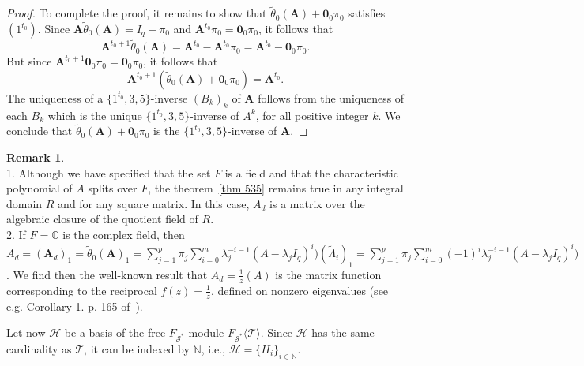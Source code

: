 \documentclass[12pt]{amsart}
\theoremstyle{definition}
\newtheorem{remark}[thrm]{Remark}
\numberwithin{equation}{section}
\numberwithin{equation}{section}
\begin{document}
\begin{proof}
To complete the proof, it remains to show that $\widetilde{\theta}_{0}(\pmb{A})+\pmb{0}_{0}\pi_{0}$ satisfies $(1^{t_{0}})$. Since $\pmb{A}\widetilde{\theta}_{0}(\pmb{A})=I_{q}-\pi_{0}$ and $\pmb{A}^{t_{0}}\pi_{0}=\pmb{0}_{0}\pi_{0}$, it follows that $$\pmb{A}^{t_{0}+1}\widetilde{\theta}_{0}(\pmb{A})=\pmb{A}^{t_{0}}-\pmb{A}^{t_{0}}\pi_{0}=\pmb{A}^{t_{0}}-\pmb{0}_{0}\pi_{0}.$$ But since $\pmb{A}^{t_{0}+1}\pmb{0}_{0}\pi_{0}=\pmb{0}_{0}\pi_{0}$, it follows that $$\pmb{A}^{t_{0}+1}(\widetilde{\theta}_{0}(\pmb{A})+\pmb{0}_{0}\pi_{0})=\pmb{A}^{t_{0}}.$$
The uniqueness of a $\{1^{t_{0}},3,5\}$-inverse $(B_{k})_{k}$ of $\pmb{A}$ follows from the uniqueness of each $B_{k}$ which is the unique $\{1^{t_{0}},3,5\}$-inverse of $A^{k}$, for all positive integer $k$. We conclude that $\widetilde{\theta}_{0}(\pmb{A})+\pmb{0}_{0}\pi_{0}$ is the $\{1^{t_{0}},3,5\}$-inverse of $\pmb{A}$.
\end{proof}
\begin{remark}~
\\1. Although we have specified that the set $F$ is a field and that the characteristic polynomial of $A$ splits over $F$, the theorem~\ref{thm 535} remains true in any integral domain $R$ and for any square matrix. In this case, $A_{d}$ is a matrix over the algebraic closure of the quotient field of $R$.
\\2. If $F=\mathbb{C}$ is the complex field, then $A_{d}=(\pmb{A}_{d})_{1}=\widetilde{\theta}_{0}(\pmb{A})_{1}=
\displaystyle\sum_{j=1}^{p} \pi_{j} \sum_{i=0}^{m}\lambda_{j}^{-i-1}(A-\lambda_{j}I_{q})^{i})(\widetilde{\Lambda}_{i})_{1}=\sum_{j=1}^{p} \pi_{j} \sum_{i=0}^{m}(-1)^{i}\lambda_{j}^{-i-1}(A-\lambda_{j}I_{q})^{i})$. We find then the well-known result that $A_{d}=\frac{1}{z}(A)$ is the matrix function corresponding to the reciprocal $f(z)= \frac{1}{z}$, defined on nonzero eigenvalues (see e.g. Corollary 1. p. 165 of~\cite{Ben}).
\end{remark}
Let now $\mathcal{H}$ be a basis of the free $F_{\mathcal{S}^{\ast}}$-module $F_{\mathcal{S}^{\ast}}\langle \mathcal{T} \rangle$. Since $\mathcal{H}$ has the same cardinality as $\mathcal{T}$, it can be indexed by $\mathbb{N}$, i.e., $\mathcal{H}=\{H_{i}\}_{i\in \mathbb{N}}$.
\end{document}

